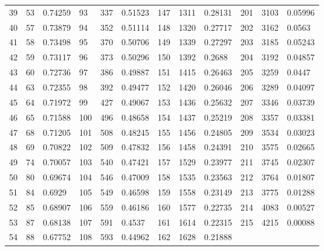 \documentclass[12pt]{elegantbook}
\begin{document}
\begin{exercise*}[3]
{\begin{longtable}[c]{lll|lll|lll|lll}
    39  & 53   & 0.74259  & 93  & 337  & 0.51523  & 147 & 1311 & 0.28131  & 201 & 3103 & 0.05996  \\
    40  & 57   & 0.73879  & 94  & 352  & 0.51114  & 148 & 1320 & 0.27717  & 202 & 3162 & 0.0563   \\
    41  & 58   & 0.73498  & 95  & 370  & 0.50706  & 149 & 1339 & 0.27297  & 203 & 3185 & 0.05243  \\
    42  & 59   & 0.73117  & 96  & 373  & 0.50296  & 150 & 1392 & 0.2688   & 204 & 3192 & 0.04857  \\
    43  & 60   & 0.72736  & 97  & 386  & 0.49887  & 151 & 1415 & 0.26463  & 205 & 3259 & 0.0447   \\
    44  & 63   & 0.72355  & 98  & 392  & 0.49477  & 152 & 1420 & 0.26046  & 206 & 3289 & 0.04097  \\
    45  & 64   & 0.71972  & 99  & 427  & 0.49067  & 153 & 1436 & 0.25632  & 207 & 3346 & 0.03739  \\
    46  & 65   & 0.71588  & 100 & 496  & 0.48658  & 154 & 1437 & 0.25219  & 208 & 3357 & 0.03381  \\
    47  & 68   & 0.71205  & 101 & 508  & 0.48245  & 155 & 1456 & 0.24805  & 209 & 3534 & 0.03023  \\
    48  & 69   & 0.70822  & 102 & 509  & 0.47832  & 156 & 1458 & 0.24391  & 210 & 3575 & 0.02665  \\
    49  & 74   & 0.70057  & 103 & 540  & 0.47421  & 157 & 1529 & 0.23977  & 211 & 3745 & 0.02307  \\
    50  & 80   & 0.69674  & 104 & 546  & 0.47009  & 158 & 1535 & 0.23563  & 212 & 3764 & 0.01807  \\
    51  & 84   & 0.6929   & 105 & 549  & 0.46598  & 159 & 1558 & 0.23149  & 213 & 3775 & 0.01288  \\
    52  & 85   & 0.68907  & 106 & 559  & 0.46186  & 160 & 1577 & 0.22735  & 214 & 4083 & 0.00527  \\
    53  & 87   & 0.68138  & 107 & 591  & 0.4537   & 161 & 1614 & 0.22315  & 215 & 4215 & 0.00088  \\
    54  & 88   & 0.67752  & 108 & 593  & 0.44962  & 162 & 1628 & 0.21888  &     &      &          \\ \hline
    \end{longtable}
    }
    \end{exercise*}
\end{document}
